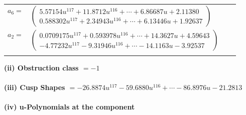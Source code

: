 \documentclass[1p]{elsarticle_modified}
\theoremstyle{definition}
\begin{document}
\begin{tabular}{m{7pt} m{180pt} m{7pt} m{180pt} }
\flushright $a_{6}=$&$\begin{pmatrix}5.57154 u^{117}+11.8712 u^{116}+\cdots+6.86687 u+2.11380\\0.588302 u^{117}+2.34943 u^{116}+\cdots+6.13446 u+1.92637\end{pmatrix}$ \\
\flushright $a_{2}=$&$\begin{pmatrix}0.0709175 u^{117}+0.593978 u^{116}+\cdots+14.3627 u+4.59643\\-4.77232 u^{117}-9.31946 u^{116}+\cdots-14.1163 u-3.92537\end{pmatrix}$\\&\end{tabular}
\flushleft \textbf{(ii) Obstruction class $= -1$}\\~\\
\flushleft \textbf{(iii) Cusp Shapes $= -26.8874 u^{117}-59.6880 u^{116}+\cdots-86.8976 u-21.2813$}\\~\\
\newpage\renewcommand{\arraystretch}{1}
\flushleft \textbf{(iv) u-Polynomials at the component}\newline \\
\end{document}
